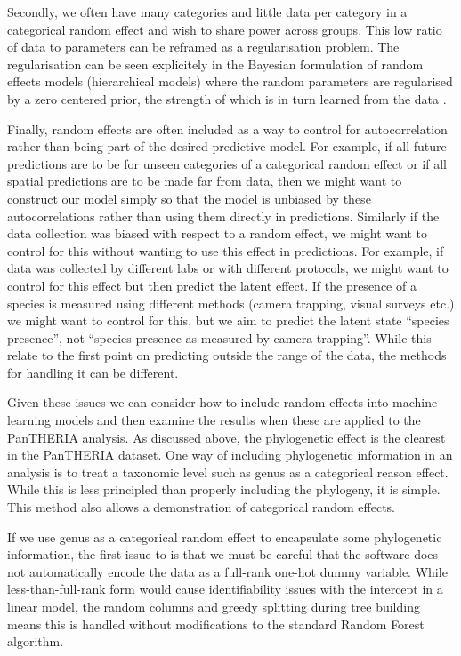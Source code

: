 \documentclass[10pt,]{article}
\begin{document}
Secondly, we often have many categories and little data per category in a categorical random effect and wish to share power across groups. This low ratio of data to parameters can be reframed as a regularisation problem. The regularisation can be seen explicitely in the Bayesian formulation of random effects models (hierarchical models) where the random parameters are regularised by a zero centered prior, the strength of which is in turn learned from the data \citep{simpson2017penalising}.

Finally, random effects are often included as a way to control for autocorrelation rather than being part of the desired predictive model. For example, if all future predictions are to be for unseen categories of a categorical random effect or if all spatial predictions are to be made far from data, then we might want to construct our model simply so that the model is unbiased by these autocorrelations rather than using them directly in predictions. Similarly if the data collection was biased with respect to a random effect, we might want to control for this without wanting to use this effect in predictions. For example, if data was collected by different labs or with different protocols, we might want to control for this effect but then predict the latent effect. If the presence of a species is measured using different methods (camera trapping, visual surveys etc.) we might want to control for this, but we aim to predict the latent state ``species presence'', not ``species presence as measured by camera trapping''. While this relate to the first point on predicting outside the range of the data, the methods for handling it can be different.

Given these issues we can consider how to include random effects into machine learning models and then examine the results when these are applied to the PanTHERIA analysis. As discussed above, the phylogenetic effect is the clearest in the PanTHERIA dataset. One way of including phylogenetic information in an analysis is to treat a taxonomic level such as genus as a categorical reason effect. While this is less principled than properly including the phylogeny, it is simple. This method also allows a demonstration of categorical random effects.

If we use genus as a categorical random effect to encapsulate some phylogenetic information, the first issue to is that we must be careful that the software does not automatically encode the data as a full-rank one-hot dummy variable. While less-than-full-rank form would cause identifiability issues with the intercept in a linear model, the random columns and greedy splitting during tree building means this is handled without modifications to the standard Random Forest algorithm.
\end{document}
